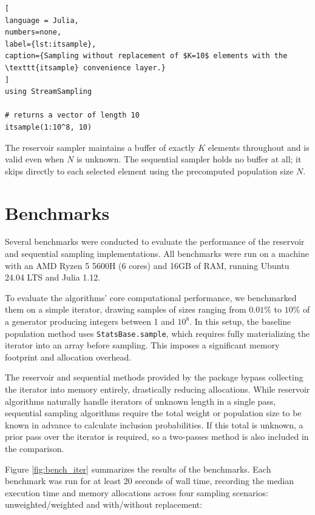 \documentclass{juliacon}
\begin{document}
\vspace{-15pt}


\begin{lstlisting}[
language = Julia,
numbers=none,
label={lst:itsample},
caption={Sampling without replacement of $K=10$ elements with the \texttt{itsample} convenience layer.}
]
using StreamSampling

# returns a vector of length 10
itsample(1:10^8, 10)
\end{lstlisting}


The reservoir sampler maintains a buffer of exactly $K$ elements throughout and is valid even when $N$ is unknown. The sequential sampler holds no buffer at all; it skips directly to each selected element using the precomputed population size $N$.

\section{Benchmarks}
\label{sec:benchmarks}

Several benchmarks were conducted to evaluate the performance of the reservoir and sequential sampling implementations\footnotemark{}. All benchmarks were run on a machine with an AMD Ryzen 5 5600H (6 cores) and 16GB of RAM, running Ubuntu 24.04 LTS and Julia 1.12.

To evaluate the algorithms' core computational performance, we benchmarked them on a simple iterator, drawing samples of sizes ranging from $0.01\%$ to $10\%$ of a generator producing integers between 1 and $10^8$. In this setup, the baseline population method uses \texttt{StatsBase.sample}, which requires fully materializing the iterator into an array before sampling. This imposes a significant memory footprint and allocation overhead.  

The reservoir and sequential methods provided by the package bypass collecting the iterator into memory entirely, drastically reducing allocations. While reservoir algorithms naturally handle iterators of unknown length in a single pass, sequential sampling algorithms require the total weight or population size to be known in advance to calculate inclusion probabilities. If this total is unknown, a prior pass over the iterator is required, so a two-passes method is also included in the comparison.

Figure \ref{fig:bench_iter} summarizes the results of the benchmarks. Each benchmark was run for at least 20 seconds of wall time, recording the median execution time and memory allocations across four sampling scenarios: unweighted/weighted and with/without replacement:
\end{document}

